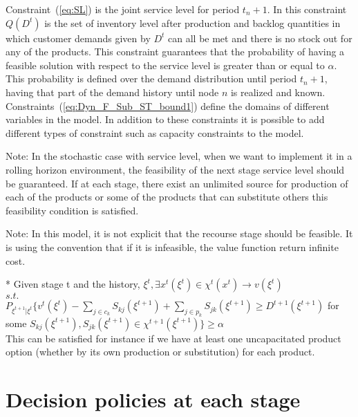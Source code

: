 \documentclass[10pt]{article}
\newcommand{\ti}{t} %
\newcommand{\Es}{S} %
\newcommand{\InvPos}{inventory level after production }
\newcommand{\cred}{\color{red!65!black}}
\begin{document}
Constraint~(\ref{eq:SL}) is the joint service level for period $\ti_n+1$. In this constraint $Q(D^ {\ti})$ is the set of \InvPos and backlog quantities in which customer demands given by $D^\ti$ can all be met and there is no stock out for any of the products. This constraint guarantees that the probability of having a feasible solution with respect to the service level is greater than or equal to $\alpha$. This probability is defined over the demand distribution until period $\ti_n+1$, having that part of the demand history until node $n$ is realized and known. Constraints~(\ref{eq:Dyn_F_Sub_ST_bound1}) define the domains of different variables in the model.
In addition to these constraints it is possible to add different types of constraint such as capacity constraints to the model.

{\cred Note:} In the stochastic case with service level, when we want to implement it in a rolling horizon environment, the feasibility of the next stage service level should be guaranteed. If at each stage, there exist an unlimited source for production of each of the products or some of the products that can substitute others this feasibility condition is satisfied.


{\cred Note: In this model, it is not explicit that the recourse stage should be feasible. It is using the convention that if it is infeasible, the value function return infinite cost.}


{\cred * Given stage t and the history, $\xi^t, \exists x^t(\xi^t) \in \chi^t(x^t) \rightarrow v(\xi^t)$\\
$s.t.$ \\
$P_{\xi^{t+1}|\xi^t}\{v^{t}(\xi^t)-\sum_{j\in c_k}\Es_{kj}(\xi^{t+1})+\sum_{j\in p_k}\Es_{jk}(\xi^{t+1}) \geq D^{t+1}(\xi^{t+1}) $ for some $\Es_{kj}(\xi^{t+1}) , \Es_{jk}(\xi^{t+1}) \in  \chi ^{t+1}(\xi^{t+1}) \} \geq \alpha$ \\
This can be satisfied for instance if we have at least one uncapacitated product option (whether by its own production or substitution) for each product.

}


\section{Decision policies at each stage}
\end{document}
